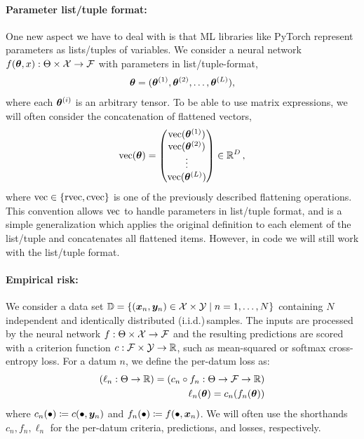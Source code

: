 \switchcolumn[1]
\switchcolumn[0]

\paragraph{Parameter list/tuple format:} One new aspect we have to deal with is that ML libraries like PyTorch represent parameters as lists/tuples of variables.
We consider a neural network $f(\vtheta, x): \Theta \times \gX \to \gF$ with parameters in list/tuple-format,
\begin{align*}
  \vtheta = (\vtheta^{(1)}, \vtheta^{(2)}, \ldots, \vtheta^{(L)}),
\end{align*}
where each $\vtheta^{(i)}$ is an arbitrary tensor. To be able to use matrix expressions, we will often consider the concatenation of flattened vectors,
\begin{align*}
  \vec(\vtheta)
  =
  \begin{pmatrix}
    \vec(\vtheta^{(1)}) \\
    \vec(\vtheta^{(2)}) \\
    \vdots              \\
    \vec(\vtheta^{(L)})
  \end{pmatrix}
  \in \sR^D
  \,,
\end{align*}
where $\vec \in \{ \rvec, \cvec \}$ is one of the previously described flattening operations.
This convention allows $\vec$ to handle parameters in list/tuple format, and is a simple generalization which applies the original definition to each element of the list/tuple and concatenates all flattened items.
However, in code we will still work with the list/tuple format.

\paragraph{Empirical risk:} We consider a data set $\sD = \{(\vx_n, \vy_n) \in \gX \times \gY \mid n = 1, \dots, N \}$ containing $N$ independent and identically distributed (i.i.d.)\,samples.
The inputs are processed by the neural network $f: \Theta \times \gX \to \gF$ and the resulting predictions are scored with a criterion function $c: \gF \times \gY \to \sR$, such as mean-squared or softmax cross-entropy loss.
For a datum $n$, we define the per-datum loss as:
\begin{align*}
  (\ell_n: \Theta \to \sR) = (c_n \circ f_n: \Theta \to \gF \to \sR)
  \\
  \ell_n(\vtheta) = c_n(f_n(\vtheta))
\end{align*}
where $c_n(\bullet) \coloneq c(\bullet, \vy_n)$ and $f_n(\bullet) \coloneq f(\bullet, \vx_n)$.
We will often use the shorthands $c_n, f_n, \ell_n$ for the per-datum criteria, predictions, and losses, respectively.

